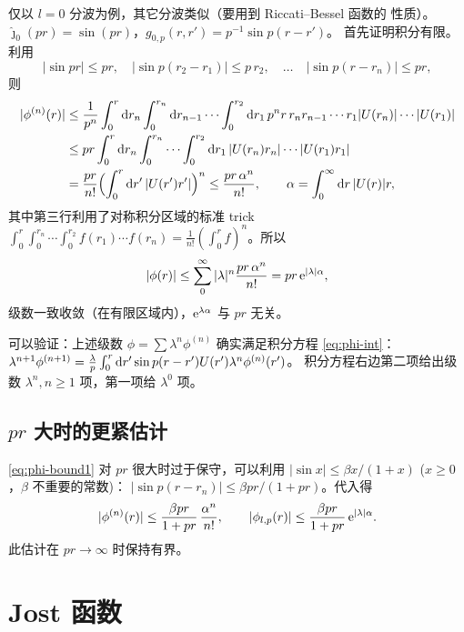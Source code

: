 \begin{proof*}
仅以 $l=0$ 分波为例，其它分波类似（要用到 Riccati--Bessel 函数的
性质）。$\hat\jmath_0(pr)=\sin(pr)$，$g_{0,p}(r,r')=p^{-1}\sin p(r-r')$。
首先证明积分有限。利用
\[
|\sin pr|\le pr,\quad
|\sin p(r_2-r_1)|\le p\,r_2,\quad
\ldots\quad
|\sin p(r-r_n)|\le pr,
\]
则
\begin{align}
|\phi^{(n)}(r)|
&\le \frac{1}{p^n}\int_0^r\mathrm{d} r_n\int_0^{r_n}\mathrm{d} r_{n-1}\cdots\int_0^{r_2}\mathrm{d} r_1\,
  p^n r\,r_n r_{n-1}\cdots r_1 |U(r_n)|\cdots|U(r_1)|\nonumber\\
&\le pr\int_0^r\mathrm{d} r_n\int_0^{r_n}\cdots\int_0^{r_2}\mathrm{d} r_1\,
   |U(r_n)r_n|\cdots|U(r_1)r_1|\nonumber\\
&= \frac{pr}{n!}\Bigl(\int_0^r \mathrm{d} r'\,|U(r')r'|\Bigr)^n
\le \frac{pr\,\alpha^n}{n!},\qquad
\alpha=\int_0^\infty \mathrm{d} r\,|U(r)|r,
\end{align}
其中第三行利用了对称积分区域的标准 trick
$\int_0^r\int_0^{r_n}\cdots\int_0^{r_2}f(r_1)\cdots f(r_n)
=\frac{1}{n!}(\int_0^r f)^n$。所以
\begin{equation}\label{eq:phi-bound1}
|\phi(r)|\le \sum_0^\infty |\lambda|^n \frac{pr\,\alpha^n}{n!}
=pr\,\mathrm{e}^{|\lambda|\alpha},
\end{equation}
级数一致收敛（在有限区域内），$\mathrm{e}^{\lambda\alpha}$ 与 $pr$ 无关。
\end{proof*}

可以验证：上述级数 $\phi=\sum\lambda^n\phi^{(n)}$ 确实满足积分方程
\eqref{eq:phi-int}：
$\lambda^{n+1}\phi^{(n+1)}=\frac{\lambda}{p}\int_0^r\mathrm{d} r'\sin p(r-r')U(r')\lambda^n\phi^{(n)}(r')$。
积分方程右边第二项给出级数 $\lambda^n,n\ge1$ 项，第一项给 $\lambda^0$ 项。

\subsection{$pr$ 大时的更紧估计}

\eqref{eq:phi-bound1} 对 $pr$ 很大时过于保守，可以利用
$|\sin x|\le \beta x/(1+x)$ ($x\ge0$，$\beta$ 不重要的常数)：
$|\sin p(r-r_n)|\le \beta pr/(1+pr)$。代入得
\begin{equation}\label{eq:phi-bound2}
|\phi^{(n)}(r)|\le \frac{\beta pr}{1+pr}\,\frac{\alpha^n}{n!},\qquad
|\phi_{l,p}(r)|\le \frac{\beta pr}{1+pr}\,\mathrm{e}^{|\lambda|\alpha}.
\end{equation}
此估计在 $pr\to\infty$ 时保持有界。

\section{Jost 函数}\label{sec:Jost}

